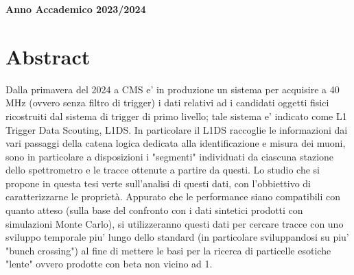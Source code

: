 \documentclass[a4paper, 11pt]{book}
\begin{document}
\begin{titlepage}
\begin{spacing}{2}
\begin{tabular}{ l  c  c c c  cc c c c c  l }
\end{tabular}
\end{spacing}
\vspace{15 mm}

\begin{center}
{\Large{\bf Anno Accademico 2023/2024}}
\end{center}
\end{titlepage}
\clearpage{\pagestyle{empty}\cleardoublepage}

\frontmatter
\tableofcontents

\chapter*{Abstract}
Dalla primavera del 2024 a CMS e' in produzione un sistema per acquisire a 40 MHz (ovvero senza filtro di trigger) i dati relativi ad i candidati oggetti fisici ricostruiti dal sistema di trigger di primo livello; tale sistema e' indicato come L1 Trigger Data Scouting, L1DS. In particolare il L1DS raccoglie le informazioni dai vari passaggi della catena logica dedicata alla identificazione e misura dei muoni, sono in particolare a disposizioni i "segmenti" individuati da ciascuna stazione dello spettrometro e le tracce ottenute a partire da questi. Lo studio che si propone in questa tesi verte sull'analisi di questi dati, con l'obbiettivo di caratterizzarne le proprietà. Appurato che le performance siano compatibili con quanto atteso (sulla base del confronto con i dati sintetici prodotti con simulazioni Monte Carlo), si utilizzeranno questi dati per cercare tracce con uno sviluppo temporale piu' lungo dello standard (in particolare sviluppandosi su piu' "bunch crossing") al fine di mettere le basi per la ricerca di particelle esotiche "lente" ovvero prodotte con beta non vicino ad 1.

\mainmatter









\appendix




%
\end{document}
